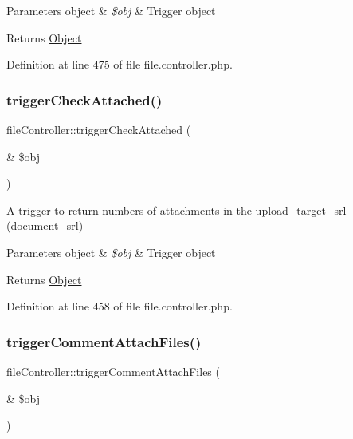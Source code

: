 \begin{DoxyParams}[1]{Parameters}
object & {\em \$obj} & Trigger object \\
\hline
\end{DoxyParams}
\begin{DoxyReturn}{Returns}
\hyperlink{classObject}{Object} 
\end{DoxyReturn}


Definition at line 475 of file file.\+controller.\+php.

\hypertarget{classfileController_ab23c495b5b662264a1c7adfda86f715f}{}\label{classfileController_ab23c495b5b662264a1c7adfda86f715f} 
\subsubsection{\texorpdfstring{trigger\+Check\+Attached()}{triggerCheckAttached()}}
{\footnotesize\ttfamily file\+Controller\+::trigger\+Check\+Attached (\begin{DoxyParamCaption}\item[{\&}]{\$obj }\end{DoxyParamCaption})}

A trigger to return numbers of attachments in the upload\+\_\+target\+\_\+srl (document\+\_\+srl)


\begin{DoxyParams}[1]{Parameters}
object & {\em \$obj} & Trigger object \\
\hline
\end{DoxyParams}
\begin{DoxyReturn}{Returns}
\hyperlink{classObject}{Object} 
\end{DoxyReturn}


Definition at line 458 of file file.\+controller.\+php.

\hypertarget{classfileController_ab25a513258ef9c9e2dc2af274c9c24e7}{}\label{classfileController_ab25a513258ef9c9e2dc2af274c9c24e7} 
\subsubsection{\texorpdfstring{trigger\+Comment\+Attach\+Files()}{triggerCommentAttachFiles()}}
{\footnotesize\ttfamily file\+Controller\+::trigger\+Comment\+Attach\+Files (\begin{DoxyParamCaption}\item[{\&}]{\$obj }\end{DoxyParamCaption})}

